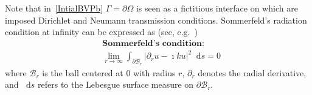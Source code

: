 \documentclass[a4paper,11pt]{article}
\newcommand{\diff}{\mathop{}\!\mathrm{d}}   %
\begin{document}
Note that in~\eqref{IntialBVPb} $\Gamma = \partial \Omega$ is seen as a fictitious interface on which are imposed Dirichlet and Neumann transmission conditions. Sommerfeld's radiation condition at infinity can be expressed as (see, e.g.~\cite[§2.6.5]{MR1822275}) 
\begin{equation}\label{SommerfeldRadiationCondition}
  \begin{aligned}
    &\textbf{Sommerfeld's condition:}\\
    &\lim_{r\to \infty}\int_{\partial\mathcal{B}_r}\vert \partial_{r}u-\imath k u\vert^{2} \diff s = 0
  \end{aligned}
\end{equation}
where $\mathcal{B}_r$ is the ball centered at $0$ with radius $r$,
$\partial_r$ denotes the radial derivative, and $\diff s$ refers to the
Lebesgue surface measure on $\partial\mathcal{B}_r$.
\end{document}
